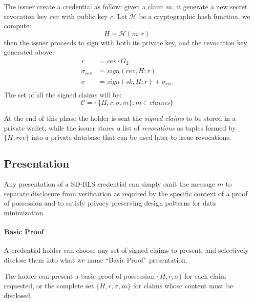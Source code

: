 The issuer create a credential as follow: given a claim $m$, it
generate a new secret revocation key $rev$ with public key $r$. Let
$\mathcal{H}$ be a cryptographic hash function, we compute:
\begin{equation*}
    H = \mathcal{H}(m : r)
\end{equation*}
then the issuer proceeds to sign with both its private key, and the
revocation key generated above:
\begin{equation*}\label{rev_agg}
    \begin{split}
        r &= rev \cdot G_2 \\
        \sigma_{rev} &= sign(rev, H : r)\\
        \sigma &= sign(sk, H : r) + \sigma_{rev}\\
   \end{split}
\end{equation*}
The set of all the signed claims will be:
\begin{equation*}
   \mathcal{C} = \big\{ \{H, r, \sigma, m \} : m\in claims  \big\}
\end{equation*}

At the end of this phase the holder is sent the \textit{signed claims}
to be stored in a private wallet, while the issuer stores a list of
\textit{revocations} as tuples formed by $\{H,rev\}$ into a private
database that can be used later to issue revocations.

\subsection{Presentation} \label{presentation}

Any presentation of a SD-BLS credential can simply omit the message
$m$ to separate disclosure from verification as required by the
specific context of a proof of possession and to satisfy privacy
preserving design patterns for data minimization.

\paragraph{Basic Proof}

A credential holder can choose any set of signed claims to present,
and selectively disclose them into what we name ``Basic Proof''
presentation.

The holder can present a basic proof of possession $\{ H, r, \sigma
\}$ for each claim requested, or the complete set $\{ H, r, \sigma, m
\}$ for claims whose content must be disclosed.

